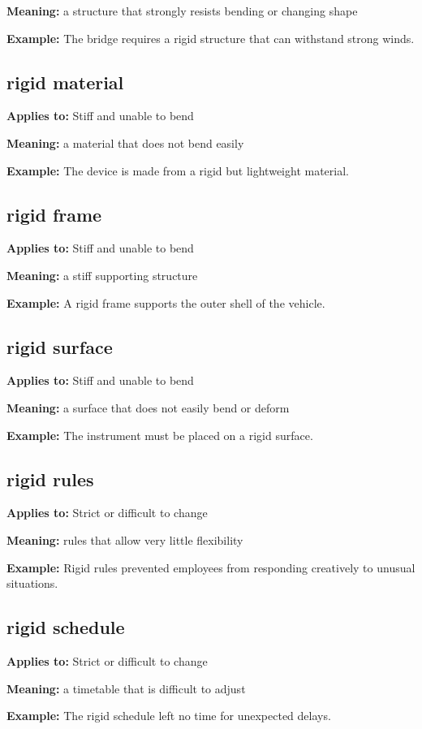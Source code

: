 \documentclass[11pt]{article}
\begin{document}
\textbf{Meaning:} a structure that strongly resists bending or changing shape

\textbf{Example:} The bridge requires a rigid structure that can withstand strong winds.

\subsection{rigid material}
\textbf{Applies to:} Stiff and unable to bend

\textbf{Meaning:} a material that does not bend easily

\textbf{Example:} The device is made from a rigid but lightweight material.

\subsection{rigid frame}
\textbf{Applies to:} Stiff and unable to bend

\textbf{Meaning:} a stiff supporting structure

\textbf{Example:} A rigid frame supports the outer shell of the vehicle.

\subsection{rigid surface}
\textbf{Applies to:} Stiff and unable to bend

\textbf{Meaning:} a surface that does not easily bend or deform

\textbf{Example:} The instrument must be placed on a rigid surface.

\subsection{rigid rules}
\textbf{Applies to:} Strict or difficult to change

\textbf{Meaning:} rules that allow very little flexibility

\textbf{Example:} Rigid rules prevented employees from responding creatively to unusual situations.

\subsection{rigid schedule}
\textbf{Applies to:} Strict or difficult to change

\textbf{Meaning:} a timetable that is difficult to adjust

\textbf{Example:} The rigid schedule left no time for unexpected delays.
\end{document}
